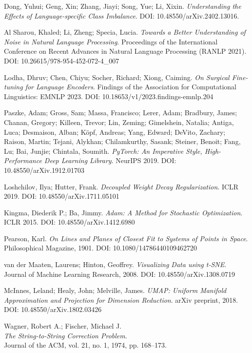 \documentclass[12pt]{article}
\begin{document}
\begin{thebibliography}{9}
Dong, Yuhui; Geng, Xin; Zhang, Jiayi; Song, Yue; Li, Xixin.
\textit{Understanding the Effects of Language-specific Class Imbalance}.
DOI: 10.48550/arXiv.2402.13016.

Al Sharou, Khaled; Li, Zheng; Specia, Lucia.
\textit{Towards a Better Understanding of Noise in Natural Language Processing}.
Proceedings of the International Conference on Recent Advances in Natural Language Processing (RANLP 2021).
DOI: 10.26615/978-954-452-072-4\_007

Lodha, Dhruv; Chen, Chiyu; Socher, Richard; Xiong, Caiming.
\textit{On Surgical Fine-tuning for Language Encoders}.
Findings of the Association for Computational Linguistics: EMNLP 2023.
DOI: 10.18653/v1/2023.findings-emnlp.204

Paszke, Adam; Gross, Sam; Massa, Francisco; Lerer, Adam; Bradbury, James; Chanan, Gregory; Killeen, Trevor; Lin, Zeming; Gimelshein, Natalia; Antiga, Luca; Desmaison, Alban; Köpf, Andreas; Yang, Edward; DeVito, Zachary; Raison, Martin; Tejani, Alykhan; Chilamkurthy, Sasank; Steiner, Benoit; Fang, Lu; Bai, Junjie; Chintala, Soumith.
\textit{PyTorch: An Imperative Style, High-Performance Deep Learning Library}.
NeurIPS 2019.
DOI: 10.48550/arXiv.1912.01703

Loshchilov, Ilya; Hutter, Frank.
\textit{Decoupled Weight Decay Regularization}.
ICLR 2019.
DOI: 10.48550/arXiv.1711.05101

Kingma, Diederik P.; Ba, Jimmy.
\textit{Adam: A Method for Stochastic Optimization}.
ICLR 2015.
DOI: 10.48550/arXiv.1412.6980

Pearson, Karl.
\textit{On Lines and Planes of Closest Fit to Systems of Points in Space}.
Philosophical Magazine, 1901.
DOI: 10.1080/14786440109462720

van der Maaten, Laurens; Hinton, Geoffrey.
\textit{Visualizing Data using t-SNE}.
Journal of Machine Learning Research, 2008.
DOI: 10.48550/arXiv.1308.0719

McInnes, Leland; Healy, John; Melville, James.
\textit{UMAP: Uniform Manifold Approximation and Projection for Dimension Reduction}.
arXiv preprint, 2018.
DOI: 10.48550/arXiv.1802.03426

Wagner, Robert A.; Fischer, Michael J.\\
\textit{The String-to-String Correction Problem}.\\
Journal of the ACM, vol. 21, no. 1, 1974, pp. 168--173.


\end{thebibliography}
\end{document}
